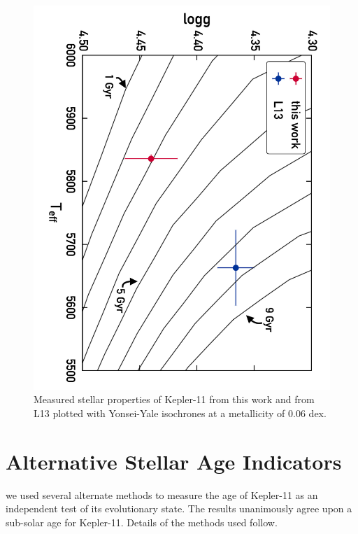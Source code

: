 \documentclass[twocolumn,trackchanges]{aastex61}
\begin{document}
\begin{figure}
\centering
\includegraphics[angle=270,width=\columnwidth]{isochrones_annotated}
\caption{Measured stellar properties of Kepler-11 from this work and from L13 plotted with Yonsei-Yale isochrones at a metallicity of 0.06 dex.}
\label{fig:isochrones}
\end{figure}

\section{Alternative Stellar Age Indicators}
\label{s:ages}

  we used several alternate methods to measure the age of Kepler-11 as an independent test of its evolutionary state. The results unanimously agree upon a sub-solar age for Kepler-11. Details of the methods used follow.
\end{document}
